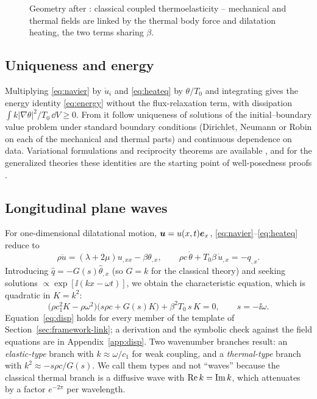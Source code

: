 \begin{figure}[t!]\centering\small

\caption{Geometry after \citep{Biot1956}: classical coupled thermoelasticity -- mechanical and thermal fields are linked by the thermal body force and dilatation heating, the two terms sharing $\beta$.}\label{fig:classical-coup}
\end{figure}

\subsection{Uniqueness and energy}
Multiplying \eqref{eq:navier} by $\dot u_i$ and \eqref{eq:heateq} by $\theta/T_0$ and integrating gives the energy identity \eqref{eq:energy} without the flux-relaxation term, with dissipation $\int k|\nabla\theta|^2/T_0\,\dd V\ge0$. From it follow uniqueness of solutions of the initial--boundary value problem under standard boundary conditions (Dirichlet, Neumann or Robin on each of the mechanical and thermal parts) and continuous dependence on data. Variational formulations and reciprocity theorems are available \citep{Marotti2013,Carlson1972,Nowacki1975}, and for the generalized theories these identities are the starting point of well-posedness proofs \citep{Chandrasekharaiah1996,Quintanilla2019}.

\subsection{Longitudinal plane waves}\label{sec:longitudinal}
For one-dimensional dilatational motion, $\bm u=u(x,t)\bm e_x$, \eqref{eq:navier}--\eqref{eq:heateq} reduce to
\begin{equation}
\rho\ddot u=(\lambda+2\mu)u_{,xx}-\beta\theta_{,x},\qquad \rho c\,\dot\theta+T_0\beta\,\dot u_{,x}=-q_{,x}.\label{eq:1d}
\end{equation}
Introducing $\hat q=-G(s)\hat\theta_{,x}$ (so $G=k$ for the classical theory) and seeking solutions $\propto\exp[\ii(kx-\omega t)]$, we obtain the characteristic equation, which is quadratic in $K=k^2$:
\begin{equation}
\bigl(\rho c_1^2K-\rho\omega^2\bigr)\bigl(s\rho c+G(s)K\bigr)+\beta^2T_0\,s\,K=0,\qquad s=-\ii\omega. \label{eq:disp}
\end{equation}
Equation~\eqref{eq:disp} holds for every member of the template of Section~\ref{sec:framework-link}; a derivation and the symbolic check against the field equations are in Appendix~\ref{app:disp}. Two wavenumber branches result: an \emph{elastic-type} branch with $k\approx\omega/c_1$ for weak coupling, and a \emph{thermal-type} branch with $k^2\approx-s\rho c/G(s)$. We call them types and not ``waves'' because the classical thermal branch is a diffusive wave with $\operatorname{Re} k=\operatorname{Im} k$, which attenuates by a factor $e^{-2\pi}$ per wavelength.

